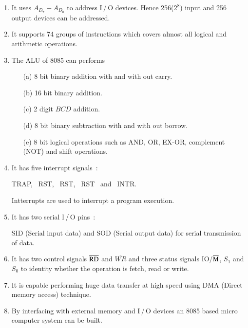 \begin{enumerate}
\item It uses $A_{D_{7}}-A_{D_{0}}$ to address I\,/\,O devices. Hence 256($2^8$) input and 256 output devices can be addressed.

\item It supports 74 groups of instructions which covers almost all logical and arithmetic operations.

\item The ALU of 8085 can performs
\begin{itemize}
\item[(a)] 8 bit binary addition with and with out carry.

\item[(b)] 16 bit binary addition.

\eject

\item[(c)] 2 digit $BCD$ addition.

\item[(d)] 8 bit binary subtraction with and with out borrow.

\item[(e)] 8 bit logical operations such as AND, OR, EX-OR, complement (NOT) and shift operations.
\end{itemize}

\item It has five interrupt signals~:
\begin{center}
TRAP, \ RST, \ RST, \ RST \ and \ INTR.
\end{center}
Intterrupts are used to interrupt a program execution.

\item It has two serial I\,/\,O pins~:

SID (Serial input data) and SOD (Serial output data) for serial transmission of data.

\item It has two control signals $\overline{\rm RD}$ and $\overline{WR}$ and three status signals IO/$\overline{\rm M}$, $S_{1}$ and $S_{0}$ to identity whether the operation is fetch, read or write.

\item It is capable performing huge data transfer at high speed using DMA (Direct memory access) technique.

\item By interfacing with external memory and I\,/\,O devices an 8085 based micro computer system can be built.
\end{enumerate}


